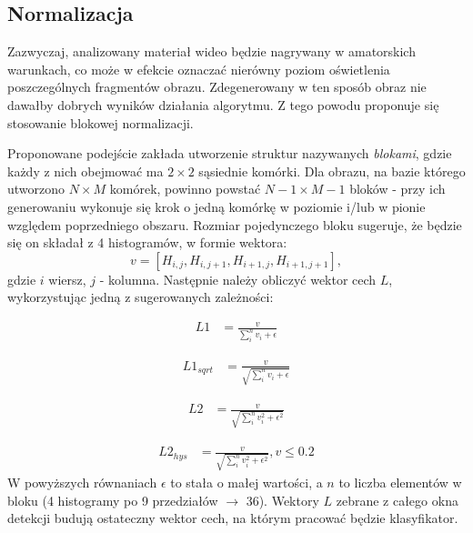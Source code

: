 \subsection{Normalizacja}
Zazwyczaj, analizowany materiał wideo będzie nagrywany w amatorskich warunkach, co może w efekcie oznaczać nierówny poziom oświetlenia poszczególnych fragmentów obrazu. Zdegenerowany w ten sposób obraz nie dawałby dobrych wyników działania algorytmu. Z tego powodu proponuje się stosowanie blokowej normalizacji. 

Proponowane podejście zakłada utworzenie struktur nazywanych \textit{blokami}, gdzie każdy z nich obejmować ma $2\times 2$ sąsiednie komórki. Dla obrazu, na bazie którego utworzono $N \times M$ komórek, powinno powstać $N-1 \times M-1$ bloków - przy ich generowaniu wykonuje się krok o jedną komórkę w poziomie i/lub w pionie względem poprzedniego obszaru. Rozmiar pojedynczego bloku sugeruje, że będzie się on składał z 4 histogramów, w formie wektora: 
\begin{equation}
v=[H_{i,j}, H_{i,j+1}, H_{i+1,j}, H_{i+1,j+1}],
\end{equation} 
gdzie $i$  wiersz, $j$ - kolumna. Następnie należy obliczyć wektor cech $L$, wykorzystując jedną z sugerowanych zależności:

\begin{equation}
\label{eq:HOG_norm1}
\left.\begin{aligned} 
L1&=\frac{v}{\sum_{i}^{n}v_i+\epsilon}
\end{aligned}\right.
\end{equation}

\begin{equation}
\label{eq:HOG_norm2}
\left.\begin{aligned} 
L1_{sqrt}&=\frac{v}{\sqrt{\sum_{i}^{n}v_i+\epsilon}}
\end{aligned}\right.
\end{equation}

\begin{equation}
\label{eq:HOG_norm3}
\left.\begin{aligned} 
L2&=\frac{v}{\sqrt{\sum_{i}^{n}v_i^2+\epsilon^2}}
\end{aligned}\right.
\end{equation}

\begin{equation}
\label{eq:HOG_norm4}
\left.\begin{aligned} 
L2_{hys}&=\frac{v}{\sqrt{\sum_{i}^{n}v_i^2+\epsilon^2}}, v\leq 0.2
\end{aligned}\right.
\end{equation}
W powyższych równaniach $\epsilon$ to stała o małej wartości, a $n$ to liczba elementów w bloku (4 histogramy po 9 przedziałów $\rightarrow$ 36). Wektory $L$ zebrane z całego okna detekcji budują ostateczny wektor cech, na którym pracować będzie klasyfikator.

